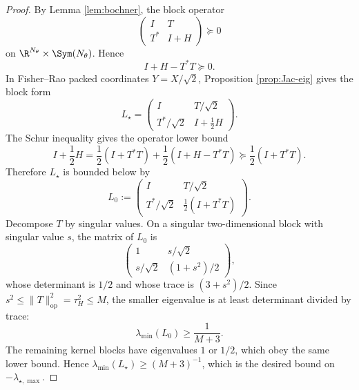 \begin{proof}
    By Lemma \ref{lem:bochner}, the block operator
    \begin{equation*}
        \begin{pmatrix}
            I & T \\
            T^* & I+H
        \end{pmatrix}
        \succeq 0
    \end{equation*}
    on $\R^{N_\theta}\times \Sym(N_\theta)$. Hence
    \begin{equation*}
        I+H-T^*T \succeq 0.
    \end{equation*}
    In Fisher--Rao packed coordinates $Y=X/\sqrt{2}$, Proposition \ref{prop:Jac-eig} gives the block form
    \begin{equation*}
        L_\star
        =
        \begin{pmatrix}
            I & T/\sqrt{2} \\
            T^*/\sqrt{2} & I+\frac12 H
        \end{pmatrix}.
    \end{equation*}
    The Schur inequality gives the operator lower bound
    \begin{equation*}
        I+\frac12 H
        =
        \frac12(I+T^*T)
        +
        \frac12(I+H-T^*T)
        \succeq
        \frac12(I+T^*T).
    \end{equation*}
    Therefore $L_\star$ is bounded below by
    \begin{equation*}
        L_0
        :=
        \begin{pmatrix}
            I & T/\sqrt{2} \\
            T^*/\sqrt{2} & \frac12(I+T^*T)
        \end{pmatrix}.
    \end{equation*}
    Decompose $T$ by singular values. On a singular two-dimensional block with singular value $s$, the matrix of $L_0$ is
    \begin{equation*}
        \begin{pmatrix}
            1 & s/\sqrt{2} \\
            s/\sqrt{2} & (1+s^2)/2
        \end{pmatrix},
    \end{equation*}
    whose determinant is $1/2$ and whose trace is $(3+s^2)/2$. Since $s^2\leq \|T\|_{\mathrm{op}}^2=\tau_H^2\leq M$, the smaller eigenvalue is at least determinant divided by trace:
    \begin{equation*}
        \lambda_{\min}(L_0)
        \geq
        \frac{1}{M+3}.
    \end{equation*}
    The remaining kernel blocks have eigenvalues $1$ or $1/2$, which obey the same lower bound.
    Hence $\lambda_{\min}(L_\star)\geq (M+3)^{-1}$, which is the desired bound on $-\lambda_{\star,\max}$.
\end{proof}

